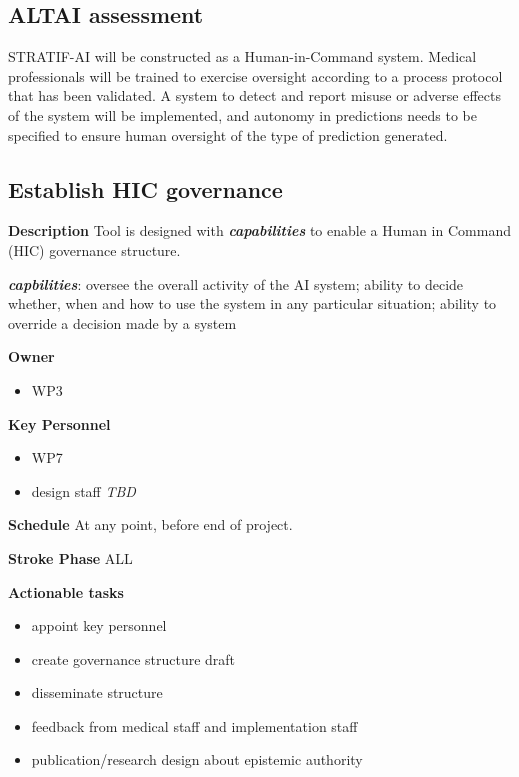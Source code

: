 \documentclass[
  letterpaper,
  DIV=11,
  numbers=noendperiod]{scrreport}
\providecommand{\tightlist}{%
  \setlength{\itemsep}{0pt}\setlength{\parskip}{0pt}}\usepackage{longtable,booktabs,array}
\begin{document}
\hypertarget{altai-assessment-1}{%
\subsection*{ALTAI assessment}\label{altai-assessment-1}}

STRATIF-AI will be constructed as a Human-in-Command system. Medical
professionals will be trained to exercise oversight according to a
process protocol that has been validated. A system to detect and report
misuse or adverse effects of the system will be implemented, and
autonomy in predictions needs to be specified to ensure human oversight
of the type of prediction generated.

\hypertarget{establish-hic-governance}{%
\subsection{Establish HIC governance}\label{establish-hic-governance}}

\textbf{Description} Tool is designed with \textbf{\emph{capabilities}}
to enable a Human in Command (HIC) governance structure.

\textbf{\emph{capbilities}}: oversee the overall activity of the AI
system; ability to decide whether, when and how to use the system in any
particular situation; ability to override a decision made by a system

\textbf{Owner}

\begin{itemize}
\tightlist
\item
  WP3
\end{itemize}

\textbf{Key Personnel}

\begin{itemize}
\tightlist
\item
  WP7
\item
  design staff \emph{TBD}
\end{itemize}

\textbf{Schedule} At any point, before end of project.

\textbf{Stroke Phase} ALL

\textbf{Actionable tasks}

\begin{itemize}
\tightlist
\item
  appoint key personnel
\item
  create governance structure draft
\item
  disseminate structure
\item
  feedback from medical staff and implementation staff
\item
  publication/research design about epistemic authority
\end{itemize}
\end{document}
